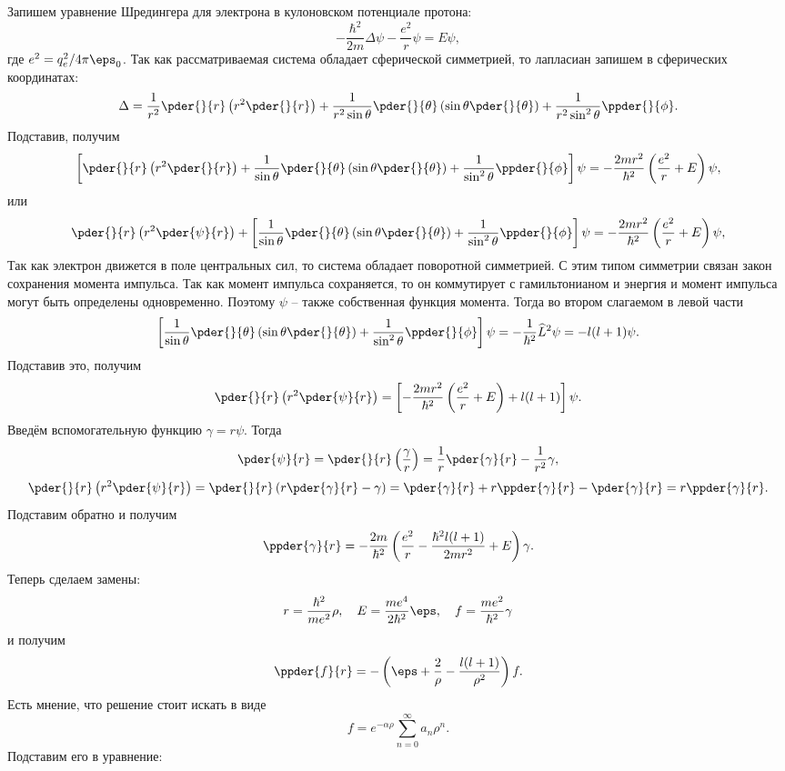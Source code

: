 Запишем уравнение Шредингера для электрона в кулоновском потенциале протона:
\[
	-\frac{\hbar^2}{2m}\Delta\psi - \frac{e^2}{r}\psi = E\psi,
\]
где \( e^2 = q_e^2/4\pi\eps_0 \). Так как рассматриваемая система обладает
сферической симметрией, то лапласиан запишем в сферических координатах:
\[
	\Delta = \frac{1}{r^2}\pder{}{r}\left(r^2\pder{}{r}\right) +
	\frac{1}{r^2\sin\theta}\pder{}{\theta}\left(\sin\theta\pder{}{\theta}\right) +
	\frac{1}{r^2\sin^2\theta}\ppder{}{\phi}.
\]
Подставив, получим
\[
	\left[\pder{}{r}\left(r^2\pder{}{r}\right) +
	\frac{1}{\sin\theta}\pder{}{\theta}\left(\sin\theta\pder{}{\theta}\right) +
	\frac{1}{\sin^2\theta}\ppder{}{\phi}\right]\psi =
	-\frac{2mr^2}{\hbar^2}\left(\frac{e^2}{r}+E\right)\psi,
\]
или
\[
	\pder{}{r}\left(r^2\pder{\psi}{r}\right) +
	\left[
	\frac{1}{\sin\theta}\pder{}{\theta}\left(\sin\theta\pder{}{\theta}\right) +
	\frac{1}{\sin^2\theta}\ppder{}{\phi}\right]\psi =
	-\frac{2mr^2}{\hbar^2}\left(\frac{e^2}{r}+E\right)\psi,
\]
Так как электрон движется в поле центральных сил, то система обладает
поворотной симметрией. С этим типом симметрии связан закон сохранения момента 
импульса. Так как момент импульса сохраняется, то он коммутирует
с гамильтонианом и энергия и момент импульса могут быть определены
одновременно. Поэтому \( \psi \) -- также собственная функция момента.
Тогда во втором слагаемом в левой части
\[
	\left[
	\frac{1}{\sin\theta}\pder{}{\theta}\left(\sin\theta\pder{}{\theta}\right) +
	\frac{1}{\sin^2\theta}\ppder{}{\phi}\right]\psi =
	-\frac{1}{\hbar^2}\hat{L}^2\psi = -l(l+1)\psi.
\]
Подставив это, получим
\[
	\pder{}{r}\left(r^2\pder{\psi}{r}\right) =
	\left[-\frac{2mr^2}{\hbar^2}\left(\frac{e^2}{r}+E\right)+l(l+1)\right]\psi.
\]
Введём вспомогательную функцию \( \gamma = r\psi \). Тогда
\[
	\pder{\psi}{r} = \pder{}{r}\left(\frac{\gamma}{r}\right) =
	\frac{1}{r}\pder{\gamma}{r} - \frac{1}{r^2}\gamma,
\]
\[
	\pder{}{r}\left(r^2\pder{\psi}{r}\right) = \pder{}{r}\left(
	r\pder{\gamma}{r} - \gamma\right) = \pder{\gamma}{r} + r\ppder{\gamma}{r} -
	\pder{\gamma}{r} = r\ppder{\gamma}{r}.
\]
Подставим обратно и получим
\[
	\ppder{\gamma}{r} =
	-\frac{2m}{\hbar^2}
	\left(\frac{e^2}{r} - \frac{\hbar^2l(l+1)}{2mr^2} + E\right)\gamma.
\]
Теперь сделаем замены:
\[
	r = \frac{\hbar^2}{me^2}\rho,\quad E = \frac{me^4}{2\hbar^2}\eps,\quad
	f = \frac{me^2}{\hbar^2}\gamma
\]
и получим
\[
	\ppder{f}{r} = - \left(\eps + \frac{2}{\rho} -
	\frac{l(l+1)}{\rho^2}\right)f.
\]
Есть мнение, что решение стоит искать в виде
\[
	f = e^{-\alpha\rho}\sum_{n=0}^{\infty} a_n\rho^n.
\]
Подставим его в уравнение:
